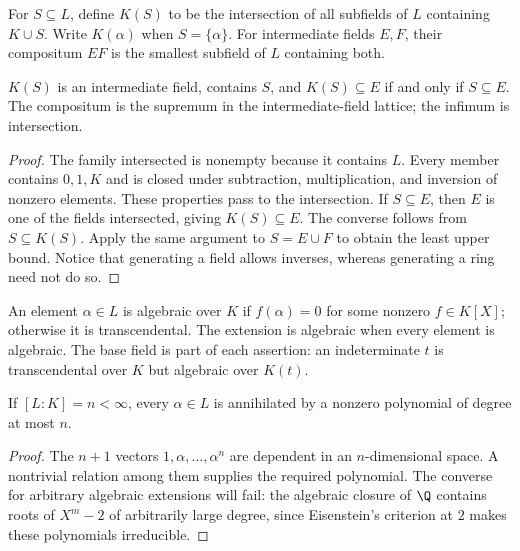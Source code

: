 \begin{definition}
For $S\subseteq L$, define $K(S)$ to be the intersection of all subfields of $L$ containing $K\cup S$. Write $K(\alpha)$ when $S=\{\alpha\}$. For intermediate fields $E,F$, their compositum $EF$ is the smallest subfield of $L$ containing both.
\end{definition}
\begin{proposition}
$K(S)$ is an intermediate field, contains $S$, and $K(S)\subseteq E$ if and only if $S\subseteq E$. The compositum is the supremum in the intermediate-field lattice; the infimum is intersection.
\end{proposition}
\begin{proof}
The family intersected is nonempty because it contains $L$. Every member contains $0,1,K$ and is closed under subtraction, multiplication, and inversion of nonzero elements. These properties pass to the intersection. If $S\subseteq E$, then $E$ is one of the fields intersected, giving $K(S)\subseteq E$. The converse follows from $S\subseteq K(S)$. Apply the same argument to $S=E\cup F$ to obtain the least upper bound. Notice that generating a field allows inverses, whereas generating a ring need not do so.
\end{proof}

\begin{definition}
An element $\alpha\in L$ is algebraic over $K$ if $f(\alpha)=0$ for some nonzero $f\in K[X]$; otherwise it is transcendental. The extension is algebraic when every element is algebraic. The base field is part of each assertion: an indeterminate $t$ is transcendental over $K$ but algebraic over $K(t)$.
\end{definition}

\begin{proposition}
If $[L:K]=n<\infty$, every $\alpha\in L$ is annihilated by a nonzero polynomial of degree at most $n$.
\end{proposition}
\begin{proof}
The $n+1$ vectors $1,\alpha,\ldots,\alpha^n$ are dependent in an $n$-dimensional space. A nontrivial relation among them supplies the required polynomial. The converse for arbitrary algebraic extensions will fail: the algebraic closure of $\Q$ contains roots of $X^m-2$ of arbitrarily large degree, since Eisenstein's criterion at $2$ makes these polynomials irreducible.
\end{proof}

